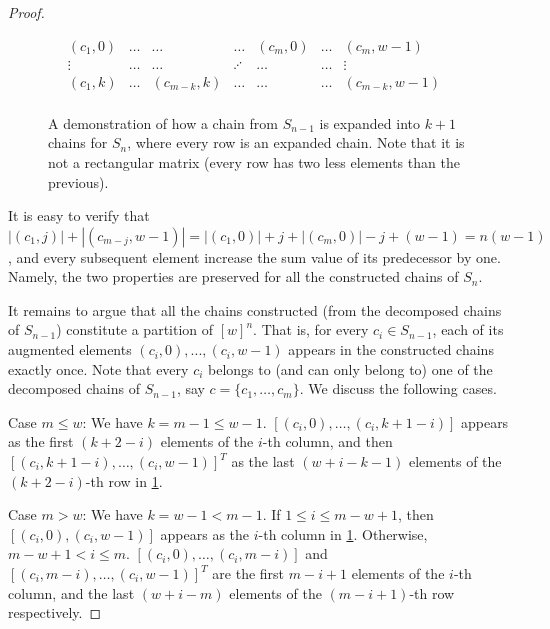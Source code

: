 \begin{proof}
\begin{figure}[ht]
\centering
    $$ 
    \begin{matrix}
    (c_{1},0) & \ldots & \ldots  & \ldots & (c_{m},0) & \ldots & (c_{m},w-1) &  \\
   \vdots  & \ldots & \ldots & \iddots & \ldots & \ldots &  \vdots & \\
     (c_{1},k) & \ldots &  (c_{m-k},k) & \ldots & \ldots & \ldots &  (c_{m-k},w-1)  &\\
    \end{matrix}
    $$
\caption{A demonstration of how a chain from $S_{n-1}$ is expanded into $k+1$ chains for $S_n$, where every row is an expanded chain. Note that it is not a rectangular matrix (every row has two less elements than the previous).}
\label{fig:induction}
\end{figure}
       
       
      
It is easy to verify that $|(c_{1}, j)| + |(c_{m - j}, w-1)| = |(c_{1}, 0)|+j + |(c_{m}, 0)|- j+(w-1) = n(w-1)$, and every subsequent element increase the sum value of its predecessor by one. Namely, the two properties are preserved for all the constructed chains of $S_{n}$. 
     
It remains to argue that all the chains constructed (from the decomposed chains of  $S_{n-1}$) constitute a  partition of $[w]^n$. 
That is, for every  $c_i \in S_{n-1}$, each of its augmented elements $(c_i,0),...,(c_i,w-1)$ appears in the constructed chains exactly once. Note that every $c_i$ belongs to (and can only belong to) one of the decomposed chains of  $S_{n-1}$, say $c=\{c_1,\ldots, c_m\}$. We discuss the following cases.
     
Case $m\leq w$: We have $k=m-1\leq w-1$. $[(c_i,0),\ldots, (c_i,k+1-i)]$
appears as the first $(k+2-i)$ elements of the $i$-th column, and then $[(c_i,k+1-i),\ldots, (c_i,w-1)]^T$ as the last $(w+i-k-1)$ elements of the $(k+2-i)$-th row in \cref{fig:induction}. 
    
Case $m> w$: We have $k=w-1 < m-1$. If $1\leq i\leq m-w+1$, then $[(c_i,0),(c_i,w-1)]$ appears as the $i$-th column in \cref{fig:induction}. Otherwise, $m-w+1<i\leq m$. $[(c_i,0),\ldots, (c_i,m-i)]$ and $[(c_i,m-i),\ldots, (c_i,w-1)]^T$
are  the first $m-i+1$ elements of the $i$-th column, and the last $(w+i-m)$ elements of the $(m-i+1)$-th row respectively.
     

\end{proof}
